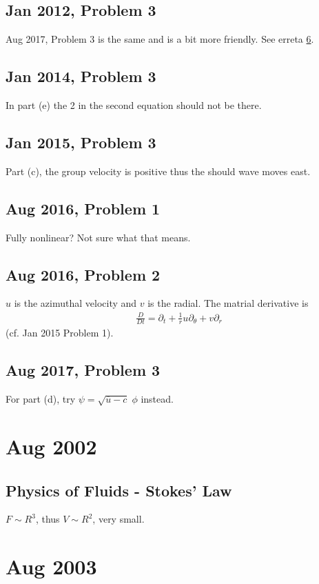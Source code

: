 \documentclass[11pt,letterpaper]{book}
\theoremstyle{definition}
\newcommand{\pe}{\partial}
\begin{document}
\section{Jan 2012, Problem 3}
Aug 2017, Problem 3 is the same and is a bit more friendly. See erreta \ref{err:aug_2017_3}. 

\section{Jan 2014, Problem 3}
In part (e) the 2 in the second equation should not be there.

\section{Jan 2015, Problem 3}\label{err:jan_2015_3}
Part (c), the group velocity is positive thus the should wave moves east.

\section{Aug 2016, Problem 1}
Fully nonlinear? Not sure what that means.

\section{Aug 2016, Problem 2}
$u$ is the azimuthal velocity and $v$ is the radial. The matrial derivative is
\begin{align*}
    \frac{D}{Dt} = \pe_t+\frac{1}{r}u\pe_\theta+v\pe_r
\end{align*}
(cf. Jan 2015 Problem 1).

\section{Aug 2017, Problem 3}\label{err:aug_2017_3}
For part (d), try $\psi = \sqrt{\overline{u}-c}\;\phi$ instead.

\chapter{Aug 2002}
\section{Physics of Fluids - Stokes' Law}
$F\sim R^3$, thus $V\sim R^2$, very small.

\chapter{Aug 2003}
\end{document}
